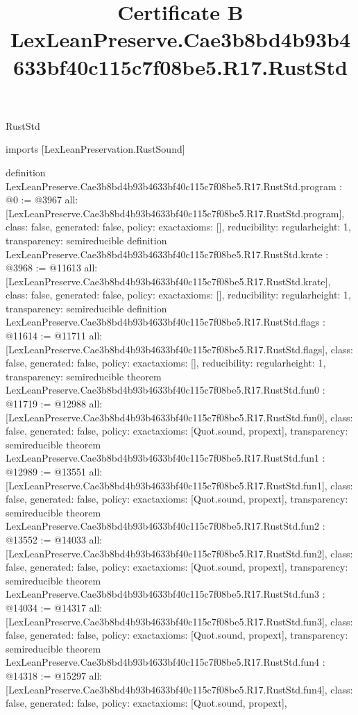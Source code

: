 \begin{lexlean}{RustStd}
\title{Certificate B LexLeanPreserve.Cae3b8bd4b93b4633bf40c115c7f08be5.R17.RustStd}
\begin{coremodule}
imports [LexLeanPreservation.RustSound]

definition LexLeanPreserve.Cae3b8bd4b93b4633bf40c115c7f08be5.R17.RustStd.program : @0 := @3967 {
  all: [LexLeanPreserve.Cae3b8bd4b93b4633bf40c115c7f08be5.R17.RustStd.program],
  class: false,
  generated: false,
  policy: exact{axioms: []},
  reducibility: regular{height: 1},
  transparency: semireducible
}
definition LexLeanPreserve.Cae3b8bd4b93b4633bf40c115c7f08be5.R17.RustStd.krate : @3968 := @11613 {
  all: [LexLeanPreserve.Cae3b8bd4b93b4633bf40c115c7f08be5.R17.RustStd.krate],
  class: false,
  generated: false,
  policy: exact{axioms: []},
  reducibility: regular{height: 1},
  transparency: semireducible
}
definition LexLeanPreserve.Cae3b8bd4b93b4633bf40c115c7f08be5.R17.RustStd.flags : @11614 := @11711 {
  all: [LexLeanPreserve.Cae3b8bd4b93b4633bf40c115c7f08be5.R17.RustStd.flags],
  class: false,
  generated: false,
  policy: exact{axioms: []},
  reducibility: regular{height: 1},
  transparency: semireducible
}
theorem LexLeanPreserve.Cae3b8bd4b93b4633bf40c115c7f08be5.R17.RustStd.fun0 : @11719 := @12988 {
  all: [LexLeanPreserve.Cae3b8bd4b93b4633bf40c115c7f08be5.R17.RustStd.fun0],
  class: false,
  generated: false,
  policy: exact{axioms: [Quot.sound, propext]},
  transparency: semireducible
}
theorem LexLeanPreserve.Cae3b8bd4b93b4633bf40c115c7f08be5.R17.RustStd.fun1 : @12989 := @13551 {
  all: [LexLeanPreserve.Cae3b8bd4b93b4633bf40c115c7f08be5.R17.RustStd.fun1],
  class: false,
  generated: false,
  policy: exact{axioms: [Quot.sound, propext]},
  transparency: semireducible
}
theorem LexLeanPreserve.Cae3b8bd4b93b4633bf40c115c7f08be5.R17.RustStd.fun2 : @13552 := @14033 {
  all: [LexLeanPreserve.Cae3b8bd4b93b4633bf40c115c7f08be5.R17.RustStd.fun2],
  class: false,
  generated: false,
  policy: exact{axioms: [Quot.sound, propext]},
  transparency: semireducible
}
theorem LexLeanPreserve.Cae3b8bd4b93b4633bf40c115c7f08be5.R17.RustStd.fun3 : @14034 := @14317 {
  all: [LexLeanPreserve.Cae3b8bd4b93b4633bf40c115c7f08be5.R17.RustStd.fun3],
  class: false,
  generated: false,
  policy: exact{axioms: [Quot.sound, propext]},
  transparency: semireducible
}
theorem LexLeanPreserve.Cae3b8bd4b93b4633bf40c115c7f08be5.R17.RustStd.fun4 : @14318 := @15297 {
  all: [LexLeanPreserve.Cae3b8bd4b93b4633bf40c115c7f08be5.R17.RustStd.fun4],
  class: false,
  generated: false,
  policy: exact{axioms: [Quot.sound, propext]},
}
\end{coremodule}
\end{lexlean}
